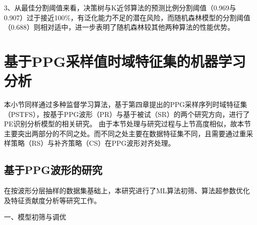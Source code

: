 3、从最佳分割阈值来看，决策树与K近邻算法的预测比例分割阈值（0.969与0.907）过于接近100\%，有泛化能力不足的潜在风险，而随机森林模型的分割阈值（0.688）则相对适中，进一步表明了随机森林较其他两种算法的性能优势。

\section{基于PPG采样值时域特征集的机器学习分析}
本小节同样通过多种监督学习算法，基于第四章提出的PPG采样序列时域特征集（PSTFS），按基于PPG波形（PR）与基于被试（SR）的两个研究方向，进行了PE识别分析模型的相关研究。
由于本节处理与研究过程与上节高度相似，故本节主要突出两部分的不同之处。而不同之处主要在数据特征集不同，且需要通过重采样策略（RS）与补齐策略（CS）在PPG波形对齐处理。

\subsection{基于PPG波形的研究}

在按波形分层抽样的数据集基础上，本研究进行了ML算法初筛、算法超参数优化及特征贡献度分析等研究工作。

一、模型初筛与调优

